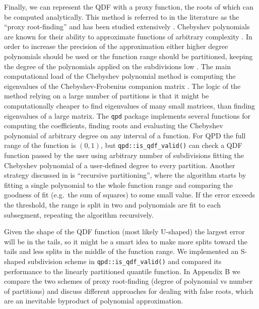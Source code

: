 \documentclass[
  12pt,
]{article}
\begin{document}
Finally, we can represent the QDF with a proxy function, the roots of which can be computed analytically. This method is referred to in the literature as the ``proxy root-finding'' and has been studied extensively \citep{boyd2013FindingZerosUnivariate}. Chebyshev polynomials are known for their ability to approximate functions of arbitrary complexity \citep{boyd2007NumericalExperimentsAccuracy}. In order to increase the precision of the approximation either higher degree polynomials should be used or the function range should be partitioned, keeping the degree of the polynomials applied on the subdivisions low \citep{boyd2006ComputingRealRoots}. The main computational load of the Chebyshev polynomial method is computing the eigenvalues of the Chebyshev-Frobenius companion matrix \citep{boyd2013FindingZerosUnivariate}. The logic of the method relying on a large number of partitions is that it might be computationally cheaper to find eigenvalues of many small matrices, than finding eigenvalues of a large matrix. The \texttt{qpd} package \citep{perepolkin2019QpdToolsQuantileparameterized} implements several functions for computing the coefficients, finding roots and evaluating the Chebyshev polynomial of arbitrary degree on any interval of a function. For QPD the full range of the function is \((0,1)\), but \texttt{qpd::is\_qdf\_valid()} can check a QDF function passed by the user using arbitrary number of subdivisions fitting the Chebyshev polynomial of a user-defined degree to every partition. Another strategy discussed in \citet{boyd2013FindingZerosUnivariate} is ``recursive partitioning'', where the algorithm starts by fitting a single polynomial to the whole function range and comparing the goodness of fit (e.g.~the sum of squares) to some small value. If the error exceeds the threshold, the range is split in two and polynomials are fit to each subsegment, repeating the algorithm recursively.

Given the shape of the QDF function (most likely U-shaped) the largest error will be in the tails, so it might be a smart idea to make more splits toward the tails and less splits in the middle of the function range. We implemented an S-shaped subdivision scheme in \texttt{qpd::is\_qdf\_valid()} and compared its performance to the linearly partitioned quantile function. In Appendix B we compare the two schemes of proxy root-finding (degree of polynomial vs number of partitions) and discuss different approaches for dealing with false roots, which are an inevitable byproduct of polynomial approximation.
\end{document}
